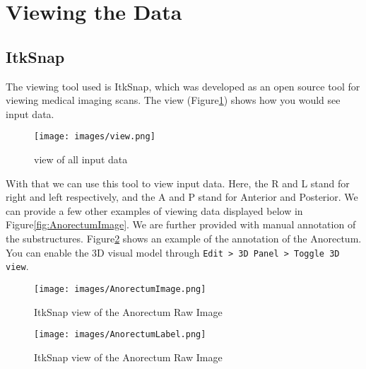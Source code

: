 \documentclass[11pt]{article}
\begin{document}
\section{Viewing the Data}\label{section:itksnap}

\subsection*{ItkSnap}

The viewing tool used is ItkSnap, which was developed as an open source tool for viewing medical imaging scans. The view (Figure\ref{fig:view}) shows how you would see input data.

\begin{figure}[H]
    \centering
    \texttt{[image: images/view.png]}
    \caption{view of all input data}\label{fig:view}
\end{figure}

With that we can use this tool to view input data. Here, the R and L stand for right and left respectively, and the A and P stand for Anterior and Posterior. We can provide a few other examples of viewing data displayed below in Figure\ref{fig:AnorectumImage}. We are further provided with manual annotation of the substructures. Figure\ref{fig:AnorectumLabel} shows an example of the annotation of the Anorectum. You can enable the 3D visual model through \texttt{Edit > 3D Panel > Toggle 3D view}.

\begin{figure}[H]
    \centering
    \captionsetup{width=0.45\textwidth}
    \begin{minipage}{.5\textwidth}
        \centering
        \texttt{[image: images/AnorectumImage.png]}
        \caption{ItkSnap view of the Anorectum Raw Image}\label{fig:AnorectumImage}
    \end{minipage}%
    \begin{minipage}{.5\textwidth}
        \centering
        \texttt{[image: images/AnorectumLabel.png]}
        \caption{ItkSnap view of the Anorectum Raw Image}\label{fig:AnorectumLabel}
    \end{minipage}%
\end{figure} 
\end{document}
